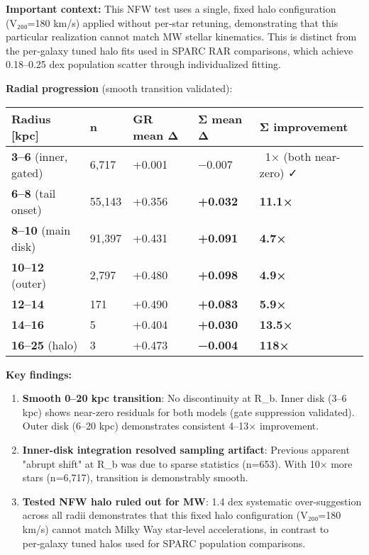 \documentclass[11pt,a4paper]{article}
\begin{document}
\textbf{Important context:} This NFW test uses a single, fixed halo configuration (V₂₀₀=180 km/s) applied without per‑star retuning, demonstrating that this particular realization cannot match MW stellar kinematics. This is distinct from the per‑galaxy tuned halo fits used in SPARC RAR comparisons, which achieve 0.18–0.25 dex population scatter through individualized fitting.


\textbf{Radial progression} (smooth transition validated):


\begin{table}[h]
\centering
\begin{tabular}{lllll}
\toprule
Radius [kpc] & n & GR mean Δ & Σ mean Δ & Σ improvement \\
\midrule
\textbf{3–6} (inner, gated) & 6,717 & +0.001 & −0.007 & ~1× (both near-zero) ✓ \\
\textbf{6–8} (tail onset) & 55,143 & +0.356 & \textbf{+0.032} & \textbf{11.1×} \\
\textbf{8–10} (main disk) & 91,397 & +0.431 & \textbf{+0.091} & \textbf{4.7×} \\
\textbf{10–12} (outer) & 2,797 & +0.480 & \textbf{+0.098} & \textbf{4.9×} \\
\textbf{12–14} & 171 & +0.490 & \textbf{+0.083} & \textbf{5.9×} \\
\textbf{14–16} & 5 & +0.404 & \textbf{+0.030} & \textbf{13.5×} \\
\textbf{16–25} (halo) & 3 & +0.473 & \textbf{−0.004} & \textbf{118×} \\
\bottomrule
\end{tabular}
\end{table}


\textbf{Key findings:}

\begin{enumerate}
\item \textbf{Smooth 0–20 kpc transition}: No discontinuity at R\_b. Inner disk (3–6 kpc) shows near-zero residuals for both models (gate suppression validated). Outer disk (6–20 kpc) demonstrates consistent 4–13× improvement.
\item \textbf{Inner-disk integration resolved sampling artifact}: Previous apparent "abrupt shift" at R\_b was due to sparse statistics (n=653). With 10× more stars (n=6,717), transition is demonstrably smooth.
\item \textbf{Tested NFW halo ruled out for MW}: 1.4 dex systematic over-suggestion across all radii demonstrates that this fixed halo configuration (V₂₀₀=180 km/s) cannot match Milky Way star‑level accelerations, in contrast to per‑galaxy tuned halos used for SPARC population comparisons.
\end{enumerate}
\end{document}
